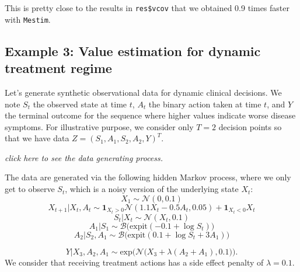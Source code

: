 \documentclass[
]{article}
\begin{document}
This is pretty close to the results in \texttt{res\$vcov} that we
obtained 0.9 times faster with \texttt{Mestim}.

\hypertarget{example-3-value-estimation-for-dynamic-treatment-regime}{%
\subsection{Example 3: Value estimation for dynamic treatment
regime}\label{example-3-value-estimation-for-dynamic-treatment-regime}}

Let's generate synthetic observational data for dynamic clinical
decisions. We note \(S_t\) the observed state at time \(t\), \(A_t\) the
binary action taken at time \(t\), and \(Y\) the terminal outcome for
the sequence where higher values indicate worse disease symptoms. For
illustrative purpose, we consider only \(T=2\) decision points so that
we have data \(Z=(S_1,A_1,S_2,A_2,Y)^T.\)

\emph{click here to see the data generating process.}

The data are generated via the following hidden Markov process, where we
only get to observe \(S_t\), which is a noisy version of the underlying
state \(X_t\): \[X_1 \sim \mathcal{N}(0,0.1)\]
\[X_{t+1}|X_t, A_t \sim \mathbf{1}_{X_t>0} \mathcal{N}(1.1X_t - 0.5A_t, 0.05) + \mathbf{1}_{X_t<0}X_t\]
\[S_t|X_t \sim \mathcal{N}(X_t,0.1)\]
\[A_1|S_1 \sim \mathcal{B}\Big(\text{expit}(-0.1+\log S_t)\Big)\]
\[A_2|S_2,A_1 \sim \mathcal{B}\Big(\text{expit}(0.1+\log S_t + 3A_1)\Big)\]

\[Y|X_3,A_2,A_1 \sim \text{exp}\Bigg(\mathcal{N}\Big(X_3 + \lambda(A_2+A_1),0.1\Big)\Bigg).\]
We consider that receiving treatment actions has a side effect penalty
of \(\lambda=0.1\).
\end{document}
